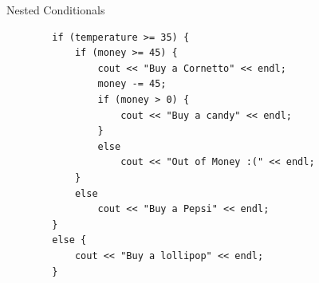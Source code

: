 \begin{frame}[fragile]{Nested Conditionals}{}
    \begin{verbatim}
        if (temperature >= 35) {
            if (money >= 45) {
                cout << "Buy a Cornetto" << endl;
                money -= 45;
                if (money > 0) {
                    cout << "Buy a candy" << endl;
                }
                else
                    cout << "Out of Money :(" << endl;
            }
            else
                cout << "Buy a Pepsi" << endl;
        }
        else {
            cout << "Buy a lollipop" << endl;
        }
    \end{verbatim}
\end{frame}


